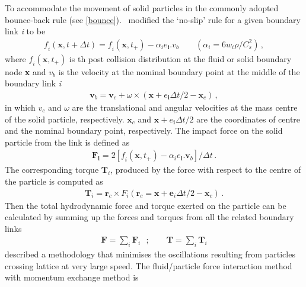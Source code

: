To accommodate the movement of solid particles in the commonly adopted 
bounce-back rule (see \cref{bounce}).~\citet{Ladd1994} modified the `no-slip' 
rule for a given boundary link \textit{i} to be
%
\begin{align}
\mathit{f_i}(\mathbf{x}, t + \Delta t)=\mathit{f_i}(\mathbf{x}, t_{+}) - 
\alpha_{\mathit{i}}\mathbf{\mathit{e}_i}.\mathbf{\mathit{v}}_{b} \qquad 
(\alpha_{i}=6\mathit{w_i}\rho/\mathit{C}_{\mathit{s}}^{2})\,,
\end{align}
%
\noindent where $\mathit{f_i}(\mathbf{x}, t_{+})$ is th post collision 
distribution at the fluid or solid boundary node \textbf{x} and 
$\mathit{v}_{b}$ is the velocity at the nominal boundary point at the middle of 
the boundary link \textit{i}
%
\begin{align}
\mathbf{v}_{b}=\mathbf{v}_{c}+\omega \times 
(\mathbf{x}+\mathbf{\mathit{e}_i}\Delta t /2 - \mathbf{x}_{c})\,,
\end{align}
%
\noindent in which $\mathbf{\mathit{v}}_{c}$ and $\omega$ are the translational 
and angular velocities at the mass centre of the solid particle, respectively. 
$\mathbf{x}_{c}$ and $\mathbf{x}+\mathbf{\mathit{e}_i}\Delta t /2$ are the 
coordinates of centre and the nominal boundary point,  respectively. The impact 
force on the solid particle from the link is defined as
%
\begin{align}
\mathbf{F_i}=2[\mathit{f_i} (\mathbf{x}, t_{+}) 
-\alpha_{\mathit{i}}\mathbf{\mathit{e}_i}.\mathbf{v}_{b}]/ \Delta t \,.
\end{align} 
%
The corresponding torque $\mathbf{T}_{\mathit{i}}$, produced by the force with 
respect to the centre of the particle is computed as
%
\begin{align}
\mathbf{T}_{\mathit{i}}=\mathbf{r}_{c} \times \mathit{F_i} 
(\mathbf{r}_{c}=\mathbf{x}+\mathbf{e}_{\mathit{i}} \Delta t /2 - \mathbf{x}_{c})
\,.
\end{align}
%
Then the total hydrodynamic force and torque exerted on the particle can be 
calculated by summing up the forces and torques from all the related boundary 
links
%
\begin{align}
\mathbf{F} = \sum\limits_{\mathit{i}}{\mathbf{F}_{\mathit{i}}} \mbox{ }; \qquad 
\mathbf{T} = \sum\limits_{\mathit{i}}{\mathbf{T}_{\mathit{i}}}
\end{align}
%
\citet{Ladd2001} described a methodology that minimises the oscillations 
resulting from particles crossing lattice at very large speed. The 
fluid/particle force interaction method with momentum exchange method is 

